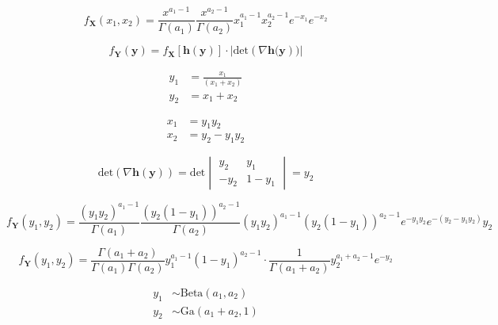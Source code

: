 \documentclass[12pt]{article}
\begin{document}
            \begin{equation}
                  f_{\mathbf{X}}(x_1, x_2) = \frac{x^{a_1-1}}{\Gamma(a_1)}\frac{x^{a_2-1}}{\Gamma(a_2)}x_1^{a_1-1} x_2^{a_2-1} e^{-x_1}e^{-x_2}
            \end{equation}

            \begin{equation}
                  f_{\mathbf{Y}}(\mathbf{y}) = f_{\mathbf{X}}[\mathbf{h(y)}]\cdot|\text{det}(\nabla \mathbf{h(y}))|
            \end{equation}

            \begin{align}
                  y_1 &= \frac{x_1}{(x_1+x_2)} \\
                  y_2 &= x_1 + x_2
            \end{align}

            \begin{align}
                  x_1 &= y_1 y_2 \\
                  x_2 &= y_2 - y_1 y_2
            \end{align}

            \begin{equation}
                  \text{det}(\nabla \mathbf{h(y)}) = \text{det}
                  \begin{vmatrix}
                  y_2 & y_1 \\
                  -y_2 & 1-y_1
                  \end{vmatrix}
                  = y_2
            \end{equation}

            \begin{equation}
                  f_{\mathbf{Y}}(y_1, y_2) = \frac{(y_1 y_2)^{a_1-1}}{\Gamma(a_1)}\frac{(y_2 (1-y_1))^{a_2-1}}{\Gamma(a_2)}(y_1 y_2)^{a_1-1} (y_2 (1-y_1))^{a_2-1} e^{-y_1 y_2}e^{-(y_2 - y_1 y_2)} y_2
            \end{equation}

            \begin{equation}
                  f_{\mathbf{Y}}(y_1, y_2) = \frac{\Gamma(a_1 + a_2)}{\Gamma(a_1) \Gamma(a_2)} y_1^{a_1 -1} (1-y_1)^{a_2 - 1} \cdot \frac{1}{\Gamma(a_1 + a_2)} y_2^{a_1 + a_2 -1} e^{-y_2}
            \end{equation}

            \begin{align}
                  y_1 &\sim \text{Beta}(a_1, a_2)\\
                  y_2 &\sim \text{Ga}(a_1 + a_2, 1)
            \end{align}
\end{document}
